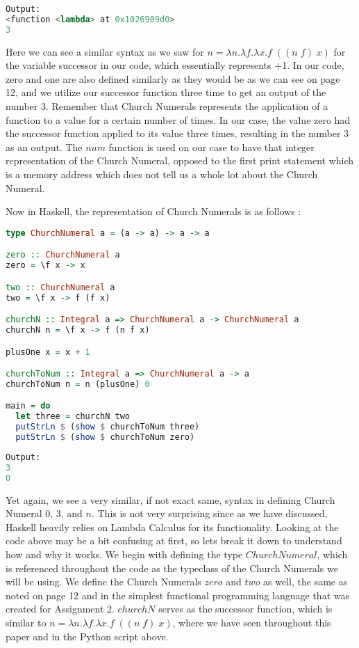\documentclass{article}
\begin{document}
\begin{lstlisting}[language=Python]
Output:
<function <lambda> at 0x1026909d0>
3
\end{lstlisting}
\noindent
Here we can see a similar syntax as we saw for $ n = \lambda n. \lambda f. \lambda x.f \; ((n \; f) \; x)$ for the variable successor in our code, which essentially represents +1. In our code, zero and one are also defined similarly as they would be as we can see on page 12, and we utilize our successor function three time to get an output of the number 3. Remember that Church Numerals represents the application of a function to a value for a certain number of times.  In our case, the value zero had the successor function applied to its value three times, resulting in the number 3 as an output. The $num$ function is used on our case to have that integer representation of the Church Numeral, opposed to the first print statement which is a memory address which does not tell us a whole lot about the Church Numeral. 

\medskip\noindent
Now in Haskell, the representation of Church Numerals is as follows \cite{Church Numerals in Haskell}:

\begin{lstlisting}[language=haskell] 
type ChurchNumeral a = (a -> a) -> a -> a

zero :: ChurchNumeral a
zero = \f x -> x

two :: ChurchNumeral a
two = \f x -> f (f x)

churchN :: Integral a => ChurchNumeral a -> ChurchNumeral a
churchN n = \f x -> f (n f x)

plusOne x = x + 1

churchToNum :: Integral a => ChurchNumeral a -> a
churchToNum n = n (plusOne) 0

main = do
  let three = churchN two
  putStrLn $ (show $ churchToNum three)
  putStrLn $ (show $ churchToNum zero)
\end{lstlisting}
\begin{lstlisting}[language=Python]
Output:
3
0
\end{lstlisting}

\noindent
Yet again, we see a very similar, if not exact same, syntax in defining Church Numeral 0, 3, and $n$. This is not very surprising since as we have discussed, Haskell heavily relies on Lambda Calculus for its functionality. Looking at the code above may be a bit confusing at first, so lets break it down to understand how and why it works. We begin with defining the type $ChurchNumeral$, which is referenced throughout the code as the typeclass of the Church Numerals we will be using. We define the Church Numerals $zero$ and $two$ as well, the same as noted on page 12 and in the simplest functional programming language that was created for Assignment 2. $churchN$ serves as the successor function, which is similar to $ n = \lambda n. \lambda f. \lambda x.f \; ((n \; f) \; x)$, where we have seen throughout this paper and in the Python script above.
\end{document}
